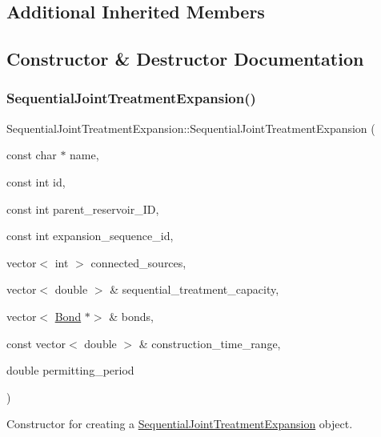 \subsection*{Additional Inherited Members}


\subsection{Constructor \& Destructor Documentation}
\mbox{\label{classSequentialJointTreatmentExpansion_ad3ca28eaaa041be6ebbd0a4593d5c9ab}} 
\subsubsection{\texorpdfstring{Sequential\+Joint\+Treatment\+Expansion()}{SequentialJointTreatmentExpansion()}\hspace{0.1cm}{\footnotesize\ttfamily [1/2]}}
{\footnotesize\ttfamily Sequential\+Joint\+Treatment\+Expansion\+::\+Sequential\+Joint\+Treatment\+Expansion (\begin{DoxyParamCaption}\item[{const char $\ast$}]{name,  }\item[{const int}]{id,  }\item[{const int}]{parent\+\_\+reservoir\+\_\+\+ID,  }\item[{const int}]{expansion\+\_\+sequence\+\_\+id,  }\item[{vector$<$ int $>$}]{connected\+\_\+sources,  }\item[{vector$<$ double $>$ \&}]{sequential\+\_\+treatment\+\_\+capacity,  }\item[{vector$<$ \mbox{\hyperlink{classBond}{Bond}} $\ast$$>$ \&}]{bonds,  }\item[{const vector$<$ double $>$ \&}]{construction\+\_\+time\+\_\+range,  }\item[{double}]{permitting\+\_\+period }\end{DoxyParamCaption})}



Constructor for creating a \mbox{\hyperlink{classSequentialJointTreatmentExpansion}{Sequential\+Joint\+Treatment\+Expansion}} object. 

